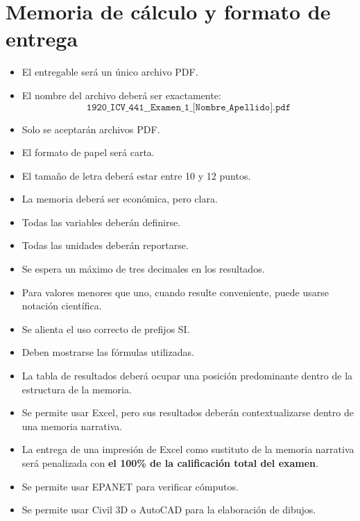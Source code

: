 \documentclass[11pt]{article}
\begin{document}
\section{Memoria de cálculo y formato de entrega}
\begin{itemize}
\item El entregable será un único archivo PDF.
\item El nombre del archivo deberá ser exactamente:
\[
\texttt{1920\_ICV\_441\_\_Examen\_1\_[Nombre\_Apellido].pdf}
\]
\item Solo se aceptarán archivos PDF.
\item El formato de papel será carta.
\item El tamaño de letra deberá estar entre \num{10} y \num{12} puntos.
\item La memoria deberá ser económica, pero clara.
\item Todas las variables deberán definirse.
\item Todas las unidades deberán reportarse.
\item Se espera un máximo de tres decimales en los resultados.
\item Para valores menores que uno, cuando resulte conveniente, puede usarse notación científica.
\item Se alienta el uso correcto de prefijos SI.
\item Deben mostrarse las fórmulas utilizadas.
\item La tabla de resultados deberá ocupar una posición predominante dentro de la estructura de la memoria.
\item Se permite usar Excel, pero sus resultados deberán contextualizarse dentro de una memoria narrativa.
\item La entrega de una impresión de Excel como sustituto de la memoria narrativa será penalizada con \textbf{el 100\% de la calificación total del examen}.
\item Se permite usar EPANET para verificar cómputos.
\item Se permite usar Civil 3D o AutoCAD para la elaboración de dibujos.
\end{itemize}
\end{document}
